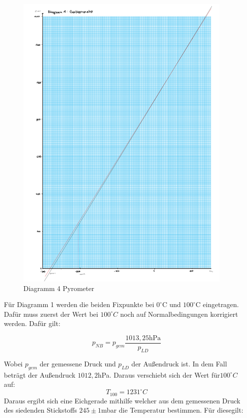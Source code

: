 \begin{figure}[h!]
    \centering
    \includegraphics[page=4, width=0.95\textwidth,]{41Dias.pdf}
    \caption{Diagramm 4 Pyrometer}
\end{figure}
\clearpage
\newpage

Für Diagramm 1 werden die beiden Fixpunkte bei $0^\circ$C und $100^\circ$C eingetragen.
Dafür muss zuerst der Wert bei $100^\circ C$ noch auf Normalbedingungen korrigiert werden.
Dafür gilt:

\begin{equation}
    p_{NB} = p_{gem} \frac{1013,25 \text{hPa}}{p_{LD}}
\end{equation}

Wobei $p_{gem}$ der gemessene Druck und $p_{LD}$ der Außendruck ist. In dem Fall beträgt der Außendruck $1012,2$hPa.
Daraus verschiebt sich der Wert für$100^\circ C$ auf:
\[T_{100} = 1231 ^\circ C\]
Daraus ergibt sich eine Eichgerade mithilfe welcher aus dem gemessenen Druck
des siedenden Stickstoffs $245 \pm 1$mbar die Temperatur bestimmen. Für diesegilt:

